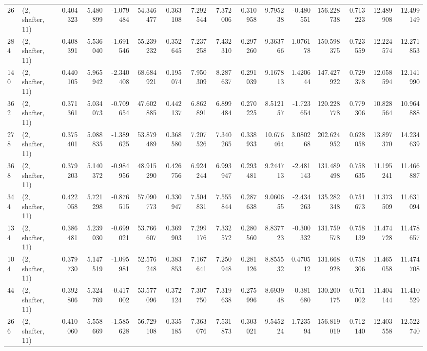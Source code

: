 \begin{tabular}{llrrrrrrrrrrrrrr}
26  &  (2, shafter, 11) &   0.404323 &   5.480899 &  -1.079484 &    54.346477 &   0.363108 &   7.292544 &   7.372006 &  0.310958 &   9.795238 &  -0.480551 &   156.228738 &  0.713223 &  12.489908 &  12.499149 \\
284 &  (2, shafter, 11) &   0.408391 &   5.536040 &  -1.691546 &    55.239232 &   0.352645 &   7.237258 &   7.432310 &  0.297260 &   9.363766 &   1.076178 &   150.598375 &  0.723559 &  12.224574 &  12.271853 \\
140 &  (2, shafter, 11) &   0.440105 &   5.965942 &  -2.340408 &    68.684921 &   0.195074 &   7.950309 &   8.287637 &  0.291039 &   9.167813 &   1.420644 &   147.427922 &  0.729378 &  12.058594 &  12.141990 \\
362 &  (2, shafter, 11) &   0.371361 &   5.034073 &  -0.709654 &    47.602885 &   0.442137 &   6.862891 &   6.899484 &  0.270225 &   8.512157 &  -1.723654 &   120.228778 &  0.779306 &  10.828564 &  10.964888 \\
278 &  (2, shafter, 11) &   0.375401 &   5.088835 &  -1.389625 &    53.879489 &   0.368580 &   7.207526 &   7.340265 &  0.338933 &  10.676464 &   3.080268 &   202.624952 &  0.628058 &  13.897370 &  14.234639 \\
368 &  (2, shafter, 11) &   0.379203 &   5.140372 &  -0.984956 &    48.915290 &   0.426756 &   6.924244 &   6.993947 &  0.293481 &   9.244713 &  -2.481143 &   131.489498 &  0.758635 &  11.195241 &  11.466887 \\
344 &  (2, shafter, 11) &   0.422058 &   5.721298 &  -0.876515 &    57.090773 &   0.330947 &   7.504831 &   7.555844 &  0.287638 &   9.060655 &  -2.434263 &   135.282348 &  0.751673 &  11.373509 &  11.631094 \\
134 &  (2, shafter, 11) &   0.386481 &   5.239030 &  -0.699021 &    53.766607 &   0.369903 &   7.299176 &   7.332572 &  0.280560 &   8.837723 &  -0.300332 &   131.759578 &  0.758139 &  11.474728 &  11.478657 \\
104 &  (2, shafter, 11) &   0.379730 &   5.147519 &  -1.095981 &    52.576248 &   0.383853 &   7.167641 &   7.250948 &  0.281126 &   8.855532 &   0.470512 &   131.668928 &  0.758306 &  11.465058 &  11.474708 \\
44  &  (2, shafter, 11) &   0.392806 &   5.324769 &  -0.417002 &    53.577096 &   0.372124 &   7.307750 &   7.319638 &  0.275996 &   8.693948 &  -0.381680 &   130.200175 &  0.761002 &  11.404144 &  11.410529 \\
266 &  (2, shafter, 11) &   0.410060 &   5.558669 &  -1.585628 &    56.729108 &   0.335185 &   7.363076 &   7.531873 &  0.303021 &   9.545224 &   1.723594 &   156.819019 &  0.712140 &  12.403558 &  12.522740 \\

\end{tabular}
